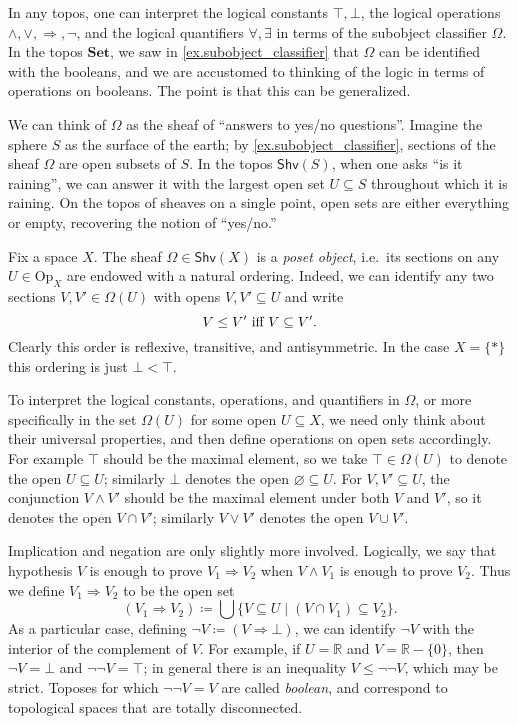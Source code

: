 \documentclass[11pt, oneside, article]{memoir}
\theoremstyle{plain}
\theoremstyle{definition}
\theoremstyle{remark}
\renewcommand{\ss}{\subseteq}
\newcommand{\Set}[1]{\mathrm{#1}}
\newcommand{\Cat}[1]{\mathbf{#1}}
\newcommand{\Fun}[1]{\mathsf{#1}}
\newcommand{\smset}{\Cat{Set}}
\newcommand{\tn}[1]{\textnormal{#1}}
\newcommand{\rr}{\mathbb{R}}
\newcommand{\shv}{\Fun{Shv}}
\newcommand{\Op}{\Set{Op}}
\newcommand{\imp}{\Rightarrow}
\newcommand{\true}{\top}
\newcommand{\false}{\bot}
\begin{document}
In any topos, one can interpret the logical constants $\true,\false$, the logical operations $\wedge,\vee,\imp,\neg$, and the logical quantifiers $\forall,\exists$ in terms of the subobject classifier $\Omega$. In the topos $\smset$, we saw in \cref{ex.subobject_classifier} that $\Omega$ can be identified with the booleans, and we are accustomed to thinking of the logic in terms of operations on booleans. The point is that this can be generalized.

We can think of $\Omega$ as the sheaf of ``answers to yes/no questions''. Imagine the sphere $S$ as the surface of the earth; by \cref{ex.subobject_classifier}, sections of the sheaf $\Omega$ are open subsets of $S$. In the topos $\shv(S)$, when one asks ``is it raining'', we can answer it with the largest open set $U\ss S$ throughout which it is raining. On the topos of sheaves on a single point, open sets are either everything or empty, recovering the notion of ``yes/no.''

Fix a space $X$. The sheaf $\Omega\in\shv(X)$ is a \emph{poset object}, i.e.\ its sections on any $U\in\Op_X$ are endowed with a natural ordering. Indeed, we can identify any two sections $V,V'\in\Omega(U)$ with opens $V,V'\ss U$ and write
\begin{equation}\label{eqn.prop_order}
V\leq V'\tn{ iff }V\ss V'.
\end{equation} 
Clearly this order is reflexive, transitive, and antisymmetric. In the case $X=\{*\}$ this ordering is just $\false<\true$.

To interpret the logical constants, operations, and quantifiers in $\Omega$, or more specifically in the set $\Omega(U)$ for some open $U\ss X$, we need only think about their universal properties, and then define operations on open sets accordingly. For example $\true$ should be the maximal element, so we take $\true\in\Omega(U)$ to denote the open $U\ss U$; similarly $\false$ denotes the open $\varnothing\ss U$. For $V,V'\ss U$, the conjunction $V\wedge V'$ should be the maximal element under both $V$ and $V'$, so it denotes the open $V\cap V'$; similarly $V\vee V'$ denotes the open $V\cup V'$.

Implication and negation are only slightly more involved. Logically, we say that hypothesis $V$ is enough to prove $V_1\imp V_2$ when $V\wedge V_1$ is enough to prove $V_2$. Thus we define $V_1\imp V_2$ to be the open set
\begin{equation}\label{eqn.implication}
	(V_1\imp V_2)\coloneqq\bigcup\{V\ss U\mid (V\cap V_1)\ss V_2\}.
\end{equation}
 As a particular case, defining $\neg V\coloneqq (V\imp \false)$, we can identify $\neg V$ with the interior of the complement of $V$. For example, if $U=\rr$ and $V=\rr-\{0\}$, then $\neg V=\false$ and $\neg\neg V=\true$; in general there is an inequality $V\leq\neg\neg V$, which may be strict. Toposes for which $\neg\neg V=V$ are called \emph{boolean}, and correspond to topological spaces that are totally disconnected.
\end{document}
